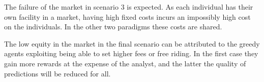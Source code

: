 The failure of the market in scenario 3 is expected. As each individual has
their own facility in a market, having high fixed costs incurs an impossibly
high cost on the individuals. In the other two paradigms these costs are
shared.

The low equity in the market in the final scenario can be attributed to the
greedy agents exploiting being able to set higher fees or free riding.
In the first case they gain more rewards at the expense of the analyst, and
the latter the quality of predictions will be reduced for all.







